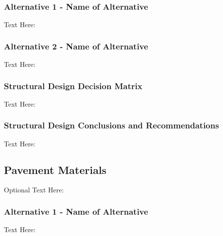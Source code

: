 \documentclass{ceri}
\begin{document}
\subsubsection{Alternative 1 - Name of Alternative}
Text Here:

\subsubsection{Alternative 2 - Name of Alternative}
Text Here:

\subsubsection{Structural Design Decision Matrix}
Text Here:

\begin{table}[H]
\centering
\caption{Structural Design Decision Matrix}
\label{my-label}
\end{table}

\subsubsection{Structural Design Conclusions and Recommendations}
Text Here:

\subsection{Pavement Materials}
Optional Text Here:

\subsubsection{Alternative 1 - Name of Alternative}
Text Here:
\end{document}

